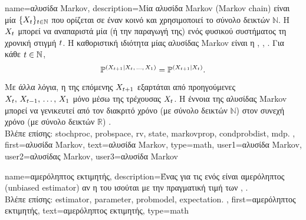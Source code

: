 {name={\foreignlanguage{greek}{αλυσίδα} Markov},
	description={\foreignlanguage{greek}{Μία αλυσίδα} Markov (Markov chain) \foreignlanguage{greek}{είναι μία} 
		 $\{X_t \}_{t \in \mathbb{N}}$ \foreignlanguage{greek}{που ορίζεται σε έναν κοινό}  
		\foreignlanguage{greek}{και χρησιμοποιεί το σύνολο δεικτών $\mathbb{N}$. Η}  $X_t$ \foreignlanguage{greek}{μπορεί 
		να αναπαριστά μία}  \foreignlanguage{greek}{(ή την παραγωγή της) ενός φυσικού συστήματος τη χρονική στιγμή $t$. 
		Η καθοριστική ιδιότητα μίας αλυσίδας} Markov \foreignlanguage{greek}{είναι η}  
		\cite{papoulis}, \cite{durrett2010probability}, \cite{NorrisMarkovChains1997}.
		\foreignlanguage{greek}{Για κάθε $t \in \mathbb{N}$,
 		\begin{equation}
 			\nonumber \mathbb{P}^{(X_{t+1} \mid X_t,\,\ldots,\,X_1)} = \mathbb{P}^{(X_{t+1} \mid X_t)}. 
 		\end{equation}
 		Με άλλα λόγια, η}  \foreignlanguage{greek}{της επόμενης}  $X_{t+1}$ 
		\foreignlanguage{greek}{εξαρτάται από προηγούμενες $X_{t},\,X_{t-1},\,\dots,\,X_{1}$ μόνο μέσω της τρέχουσας}
		 $X_{t}$. \foreignlanguage{greek}{Η έννοια της αλυσίδας} Markov \foreignlanguage{greek}{μπορεί να γενικευτεί 
		από τον διακριτό χρόνο (με σύνολο δεικτών $\mathbb{N}$) στον συνεχή χρόνο (με σύνολο δεικτών} $\mathbb{R}$) \cite{NorrisMarkovChains1997}. 
		\\ 
		\foreignlanguage{greek}{Βλέπε επίσης:} \gls{stochproc}, \gls{probspace}, \gls{rv}, \gls{state}, \gls{markovprop}, \gls{condprobdist}, \gls{mdp}. },
	first={\foreignlanguage{greek}{αλυσίδα} Markov},
	text={\foreignlanguage{greek}{αλυσίδα} Markov},
	type=math,
	user1={\foreignlanguage{greek}{αλυσίδα} Markov}, %
  	user2={\foreignlanguage{greek}{αλυσίδας} Markov}, %
	user3={\foreignlanguage{greek}{αλυσίδα} Markov} %
}

{name={\foreignlanguage{greek}{αμερόληπτος εκτιμητής}},
	description={\foreignlanguage{greek}{Ένας}  
		\foreignlanguage{greek}{για τις}  \foreignlanguage{greek}{ενός}  
	    	\foreignlanguage{greek}{είναι αμερόληπτος} (unbiased estimator) \foreignlanguage{greek}{αν η}  
		\foreignlanguage{greek}{του ισούται με την πραγματική τιμή των}  \cite{LC}, \cite{kay}.
		\\
		\foreignlanguage{greek}{Βλέπε επίσης:} \gls{estimator}, \gls{parameter}, \gls{probmodel}, \gls{expectation}. },
	first={\foreignlanguage{greek}{αμερόληπτος εκτιμητής}},
	text={\foreignlanguage{greek}{αμερόληπτος εκτιμητής}},
	type=math
}

